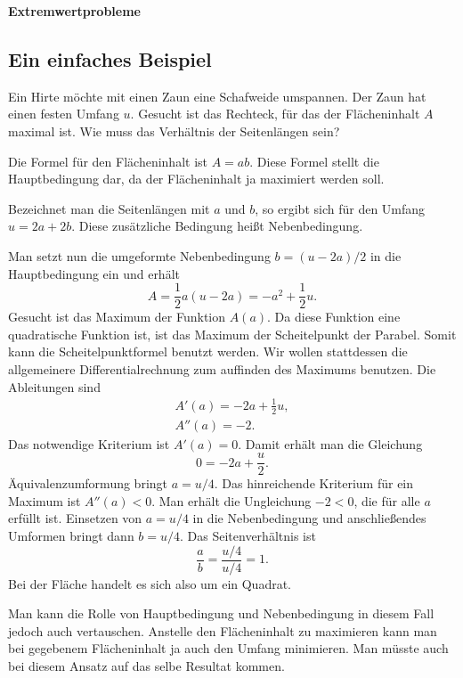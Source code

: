 \documentclass[a4paper,11pt,fleqn,twocolumn,twoside,dvipdfmx]{scrartcl}
\begin{document}
\setlength{\baselineskip}{13pt}

\noindent
{\LARGE\textbf{Extremwertprobleme}}


\subsection*{Ein einfaches Beispiel}

Ein Hirte möchte mit einen Zaun eine Schafweide umspannen.
Der Zaun hat einen festen Umfang $u$. Gesucht ist das Rechteck,
für das der Flächeninhalt $A$ maximal ist. Wie muss das Verhältnis
der Seitenlängen sein?

Die Formel für den Flächeninhalt ist $A=ab$. Diese Formel stellt
die Hauptbedingung dar, da der Flächeninhalt ja maximiert werden soll.

Bezeichnet man die Seitenlängen mit $a$ und $b$, so ergibt sich
für den Umfang $u=2a+2b$. Diese zusätzliche Bedingung heißt
Nebenbedingung.

Man setzt nun die umgeformte Nebenbedingung $b=(u-2a)/2$ in die
Hauptbedingung ein und erhält
\[A = \frac{1}{2}a(u-2a) = -a^2+\frac{1}{2}u.\]
Gesucht ist das Maximum der Funktion $A(a)$. Da diese Funktion
eine quadratische Funktion ist, ist das Maximum der Scheitelpunkt
der Parabel. Somit kann die Scheitelpunktformel benutzt werden.
Wir wollen stattdessen die allgemeinere Differentialrechnung zum
auffinden des Maximums benutzen. Die Ableitungen sind
\begin{gather*}
A'(a) = -2a+\frac{1}{2}u,\\
A''(a) = -2.
\end{gather*}
Das notwendige Kriterium ist $A'(a)=0$. Damit erhält  man die
Gleichung
\[0=-2a+\frac{u}{2}.\]
Äquivalenzumformung bringt $a=u/4$. Das hinreichende Kriterium
für ein Maximum ist $A''(a)<0$. Man erhält die Ungleichung $-2<0$,
die für alle $a$ erfüllt ist. Einsetzen von $a=u/4$ in die Nebenbedingung
und anschließendes Umformen bringt dann $b=u/4$. Das Seitenverhältnis
ist
\[\frac{a}{b} = \frac{u/4}{u/4} = 1.\]
Bei der Fläche handelt es sich also um ein Quadrat.

Man kann die Rolle von Hauptbedingung und Nebenbedingung in diesem
Fall jedoch auch vertauschen. Anstelle den Flächeninhalt zu maximieren
kann man bei gegebenem Flächeninhalt ja auch den Umfang minimieren.
Man müsste auch bei diesem Ansatz auf das selbe Resultat kommen.
\end{document}
